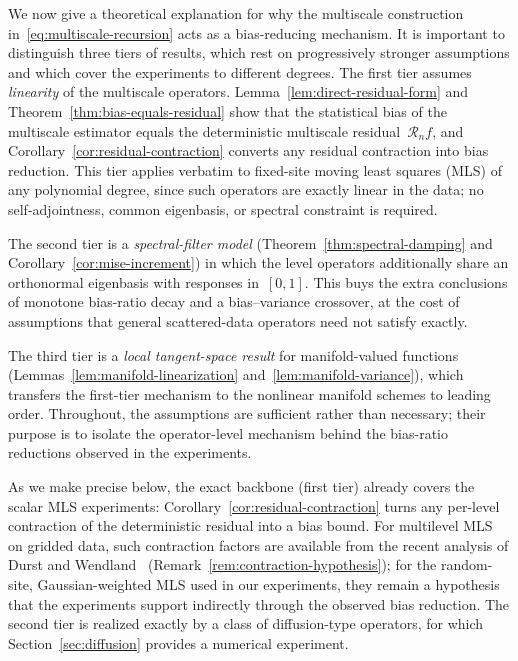\documentclass[12pt]{article}
\begin{document}
We now give a theoretical explanation for why the multiscale construction in~\eqref{eq:multiscale-recursion} acts as a bias-reducing mechanism. It is important to distinguish three tiers of results, which rest on progressively stronger assumptions and which cover the experiments to different degrees. The first tier assumes \emph{linearity} of the multiscale operators. Lemma~\ref{lem:direct-residual-form} and Theorem~\ref{thm:bias-equals-residual} show that the statistical bias of the multiscale estimator equals the deterministic multiscale residual~$\mathcal R_nf$, and Corollary~\ref{cor:residual-contraction} converts any residual contraction into bias reduction. This tier applies verbatim to fixed-site moving least squares (MLS) of any polynomial degree, since such operators are exactly linear in the data; no self-adjointness, common eigenbasis, or spectral constraint is required.

The second tier is a \emph{spectral-filter model} (Theorem~\ref{thm:spectral-damping} and Corollary~\ref{cor:mise-increment}) in which the level operators additionally share an orthonormal eigenbasis with responses in~$[0,1]$. This buys the extra conclusions of monotone bias-ratio decay and a bias--variance crossover, at the cost of assumptions that general scattered-data operators need not satisfy exactly.

The third tier is a \emph{local tangent-space result} for manifold-valued functions (Lemmas~\ref{lem:manifold-linearization} and~\ref{lem:manifold-variance}), which transfers the first-tier mechanism to the nonlinear manifold schemes to leading order. Throughout, the assumptions are sufficient rather than necessary; their purpose is to isolate the operator-level mechanism behind the bias-ratio reductions observed in the experiments.

As we make precise below, the exact backbone (first tier) already covers the scalar MLS experiments: Corollary~\ref{cor:residual-contraction} turns any per-level contraction of the deterministic residual into a bias bound. For multilevel MLS on gridded data, such contraction factors are available from the recent analysis of Durst and Wendland~\cite{durst2026improved} (Remark~\ref{rem:contraction-hypothesis}); for the random-site, Gaussian-weighted MLS used in our experiments, they remain a hypothesis that the experiments support indirectly through the observed bias reduction. The second tier is realized exactly by a class of diffusion-type operators, for which Section~\ref{sec:diffusion} provides a numerical experiment.
\end{document}
